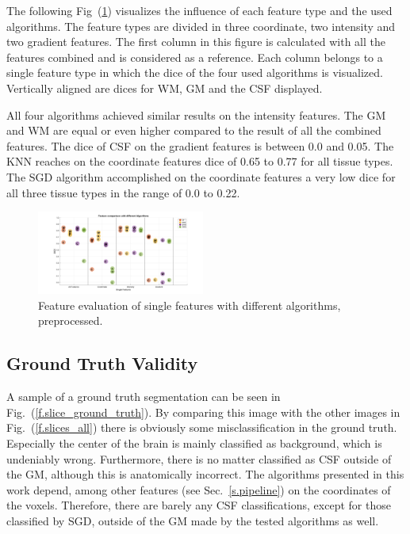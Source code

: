 \documentclass[journal]{IEEEtran}
\begin{document}
The following Fig~(\ref{FeatEval}) visualizes the influence of each feature type and the used algorithms. The feature types are divided in three coordinate, two intensity and two gradient features. The first column in this figure is calculated with all the features combined and is considered as a reference. Each column belongs to a single feature type in which the dice of the four used algorithms is visualized. Vertically aligned are dices for WM, GM and the CSF displayed.

All four algorithms achieved similar results on the intensity features. The GM and WM are equal or even higher compared to the result of all the combined features. The dice of CSF on the gradient features is between 0.0 and 0.05. The KNN reaches on the coordinate features dice of 0.65 to 0.77 for all tissue types. The SGD algorithm accomplished on the coordinate features a very low dice for all three tissue types in the range of 0.0 to 0.22.
\begin{figure}[h]
	\centering
	\includegraphics[width=0.49\textwidth]{images/FeatureEvaluation}
	\caption{Feature evaluation of single features with different algorithms, preprocessed.}
	\label{FeatEval}
\end{figure}




\subsection{Ground Truth Validity}

A sample of a ground truth segmentation can be seen in Fig.~(\ref{f.slice_ground_truth}). By comparing this image with the other images in Fig.~(\ref{f.slices_all}) there is obviously some misclassification in the ground truth. Especially the center of the brain is mainly classified as background, which is undeniably wrong. Furthermore, there is no matter classified as CSF outside of the GM, although this is anatomically incorrect. The algorithms presented in this work depend, among other features (see Sec.~\ref{s.pipeline}) on the coordinates of the voxels. Therefore, there are barely any CSF classifications, except for those classified by SGD, outside of the GM made by the tested algorithms as well.
\end{document}
